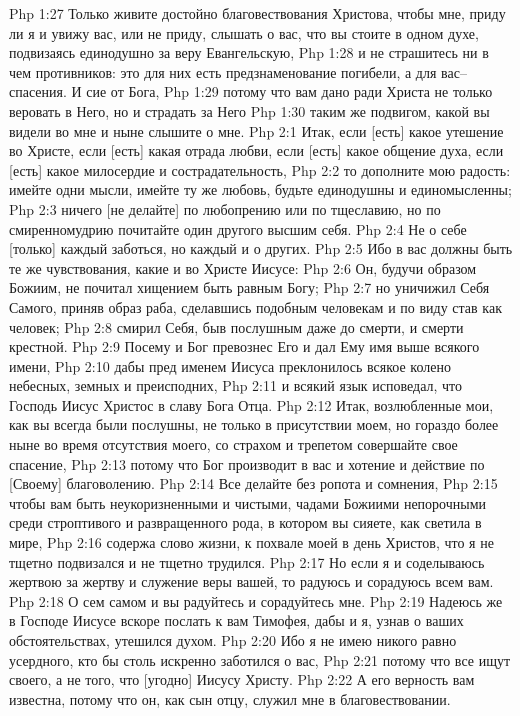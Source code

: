 Php 1:27  Только живите достойно благовествования Христова, чтобы мне, приду ли я и увижу вас, или не приду, слышать о вас, что вы стоите в одном духе, подвизаясь единодушно за веру Евангельскую,
Php 1:28  и не страшитесь ни в чем противников: это для них есть предзнаменование погибели, а для вас--спасения. И сие от Бога,
Php 1:29  потому что вам дано ради Христа не только веровать в Него, но и страдать за Него
Php 1:30  таким же подвигом, какой вы видели во мне и ныне слышите о мне.
Php 2:1  Итак, если [есть] какое утешение во Христе, если [есть] какая отрада любви, если [есть] какое общение духа, если [есть] какое милосердие и сострадательность,
Php 2:2  то дополните мою радость: имейте одни мысли, имейте ту же любовь, будьте единодушны и единомысленны;
Php 2:3  ничего [не делайте] по любопрению или по тщеславию, но по смиренномудрию почитайте один другого высшим себя.
Php 2:4  Не о себе [только] каждый заботься, но каждый и о других.
Php 2:5  Ибо в вас должны быть те же чувствования, какие и во Христе Иисусе:
Php 2:6  Он, будучи образом Божиим, не почитал хищением быть равным Богу;
Php 2:7  но уничижил Себя Самого, приняв образ раба, сделавшись подобным человекам и по виду став как человек;
Php 2:8  смирил Себя, быв послушным даже до смерти, и смерти крестной.
Php 2:9  Посему и Бог превознес Его и дал Ему имя выше всякого имени,
Php 2:10  дабы пред именем Иисуса преклонилось всякое колено небесных, земных и преисподних,
Php 2:11  и всякий язык исповедал, что Господь Иисус Христос в славу Бога Отца.
Php 2:12  Итак, возлюбленные мои, как вы всегда были послушны, не только в присутствии моем, но гораздо более ныне во время отсутствия моего, со страхом и трепетом совершайте свое спасение,
Php 2:13  потому что Бог производит в вас и хотение и действие по [Своему] благоволению.
Php 2:14  Все делайте без ропота и сомнения,
Php 2:15  чтобы вам быть неукоризненными и чистыми, чадами Божиими непорочными среди строптивого и развращенного рода, в котором вы сияете, как светила в мире,
Php 2:16  содержа слово жизни, к похвале моей в день Христов, что я не тщетно подвизался и не тщетно трудился.
Php 2:17  Но если я и соделываюсь жертвою за жертву и служение веры вашей, то радуюсь и сорадуюсь всем вам.
Php 2:18  О сем самом и вы радуйтесь и сорадуйтесь мне.
Php 2:19  Надеюсь же в Господе Иисусе вскоре послать к вам Тимофея, дабы и я, узнав о ваших обстоятельствах, утешился духом.
Php 2:20  Ибо я не имею никого равно усердного, кто бы столь искренно заботился о вас,
Php 2:21  потому что все ищут своего, а не того, что [угодно] Иисусу Христу.
Php 2:22  А его верность вам известна, потому что он, как сын отцу, служил мне в благовествовании.

